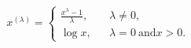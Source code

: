 \begin{displaymath}
x^{(\lambda)} = \left\{ \begin{array}{lll} 
  \frac{x^{\lambda}-1}{\lambda}, && \lambda \neq 0,\\
  \log x, && \lambda = 0\ \mbox{and} x > 0.
\end{array} \right. 
\end{displaymath}